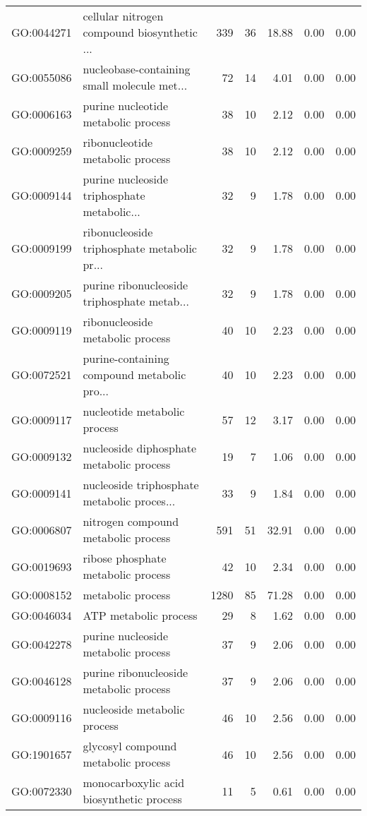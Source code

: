 \begin{table}[ht]
\begin{tabular}{llrrrrr}
  GO:0044271 & cellular nitrogen compound biosynthetic ... & 339 &  36 & 18.88 & 0.00 & 0.00 \\ 
  GO:0055086 & nucleobase-containing small molecule met... &  72 &  14 & 4.01 & 0.00 & 0.00 \\ 
  GO:0006163 & purine nucleotide metabolic process &  38 &  10 & 2.12 & 0.00 & 0.00 \\ 
  GO:0009259 & ribonucleotide metabolic process &  38 &  10 & 2.12 & 0.00 & 0.00 \\ 
  GO:0009144 & purine nucleoside triphosphate metabolic... &  32 &   9 & 1.78 & 0.00 & 0.00 \\ 
  GO:0009199 & ribonucleoside triphosphate metabolic pr... &  32 &   9 & 1.78 & 0.00 & 0.00 \\ 
  GO:0009205 & purine ribonucleoside triphosphate metab... &  32 &   9 & 1.78 & 0.00 & 0.00 \\ 
  GO:0009119 & ribonucleoside metabolic process &  40 &  10 & 2.23 & 0.00 & 0.00 \\ 
  GO:0072521 & purine-containing compound metabolic pro... &  40 &  10 & 2.23 & 0.00 & 0.00 \\ 
  GO:0009117 & nucleotide metabolic process &  57 &  12 & 3.17 & 0.00 & 0.00 \\ 
  GO:0009132 & nucleoside diphosphate metabolic process &  19 &   7 & 1.06 & 0.00 & 0.00 \\ 
  GO:0009141 & nucleoside triphosphate metabolic proces... &  33 &   9 & 1.84 & 0.00 & 0.00 \\ 
  GO:0006807 & nitrogen compound metabolic process & 591 &  51 & 32.91 & 0.00 & 0.00 \\ 
  GO:0019693 & ribose phosphate metabolic process &  42 &  10 & 2.34 & 0.00 & 0.00 \\ 
  GO:0008152 & metabolic process & 1280 &  85 & 71.28 & 0.00 & 0.00 \\ 
  GO:0046034 & ATP metabolic process &  29 &   8 & 1.62 & 0.00 & 0.00 \\ 
  GO:0042278 & purine nucleoside metabolic process &  37 &   9 & 2.06 & 0.00 & 0.00 \\ 
  GO:0046128 & purine ribonucleoside metabolic process &  37 &   9 & 2.06 & 0.00 & 0.00 \\ 
  GO:0009116 & nucleoside metabolic process &  46 &  10 & 2.56 & 0.00 & 0.00 \\ 
  GO:1901657 & glycosyl compound metabolic process &  46 &  10 & 2.56 & 0.00 & 0.00 \\ 
  GO:0072330 & monocarboxylic acid biosynthetic process &  11 &   5 & 0.61 & 0.00 & 0.00 \\ 

\end{tabular}
\end{table}
